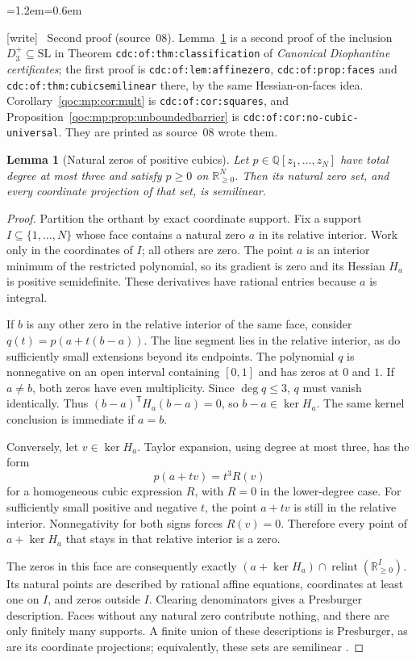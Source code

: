 \documentclass[11pt,letterpaper]{article}
\newtheorem{lemma}[theorem]{Lemma}
\theoremstyle{definition}
\theoremstyle{remark}
\newcommand{\Q}{\mathbb Q}
\newcommand{\R}{\mathbb R}
\newcommand{\relint}{\operatorname{relint}}
\newcommand{\wtag}{\textup{[write]}}
\newenvironment{writenote}{\par\smallskip\begin{list}{}{\leftmargin=1.2em\rightmargin=0.6em}\item[]\small\wtag\ }{\end{list}\smallskip}
\newcommand{\lab}[1]{\nolinkurl{#1}}
\newcommand{\Dplus}{D^{+}}
\begin{document}
\begin{writenote}
Second proof (source~08). Lemma~\ref{qoc:mp:lem:cubic} is a second proof of the inclusion $\Dplus_3\subseteq\mathrm{SL}$ in Theorem \lab{cdc:of:thm:classification} of \emph{Canonical Diophantine certificates}; the first proof is \lab{cdc:of:lem:affinezero}, \lab{cdc:of:prop:faces} and \lab{cdc:of:thm:cubicsemilinear} there, by the same Hessian-on-faces idea. Corollary~\ref{qoc:mp:cor:mult} is \lab{cdc:of:cor:squares}, and Proposition~\ref{qoc:mp:prop:unboundedbarrier} is \lab{cdc:of:cor:no-cubic-universal}. They are printed as source~08 wrote them.
\end{writenote}

\begin{lemma}[Natural zeros of positive cubics]\label{qoc:mp:lem:cubic}
Let $p\in\Q[z_1,\ldots,z_N]$ have total degree at most three and satisfy
$p\ge0$ on $\R_{\ge0}^N$. Then its natural zero set, and every coordinate
projection of that set, is semilinear.
\end{lemma}
\begin{proof}
Partition the orthant by exact coordinate support. Fix a support
$I\subseteq\{1,\ldots,N\}$ whose face contains a natural zero $a$ in its
relative interior. Work only in the coordinates of $I$; all others are
zero. The point $a$ is an interior minimum of the restricted polynomial,
so its gradient is zero and its Hessian $H_a$ is positive semidefinite.
These derivatives have rational entries because $a$ is integral.

If $b$ is any other zero in the relative interior of the same face,
consider $q(t)=p(a+t(b-a))$. The line segment lies in the relative interior,
as do sufficiently small extensions beyond its endpoints. The polynomial
$q$ is nonnegative on an open interval containing $[0,1]$ and has zeros
at $0$ and $1$. If $a\ne b$, both zeros have even multiplicity. Since
$\deg q\le3$, $q$ must vanish identically. Thus
$(b-a)^{\mathsf T}H_a(b-a)=0$, so $b-a\in\ker H_a$.
The same kernel conclusion is immediate if $a=b$.

Conversely, let $v\in\ker H_a$. Taylor expansion, using degree at most
three, has the form
\[
 p(a+tv)=t^3R(v)
\]
for a homogeneous cubic expression $R$, with $R=0$ in the lower-degree
case. For sufficiently small positive and negative $t$, the point $a+tv$
is still in the relative interior. Nonnegativity for both signs forces
$R(v)=0$. Therefore every point of $a+\ker H_a$ that stays in that relative
interior is a zero.

The zeros in this face are consequently exactly
$(a+\ker H_a)\cap\relint(\R_{\ge0}^I)$. Its natural points are described
by rational affine equations, coordinates at least one on $I$, and zeros
outside $I$. Clearing denominators gives a Presburger description. Faces
without any natural zero contribute nothing, and there are only finitely
many supports. A finite union of these descriptions is Presburger, as
are its coordinate projections; equivalently, these sets are semilinear
\cite{mp:woods}.
\end{proof}
\end{document}
